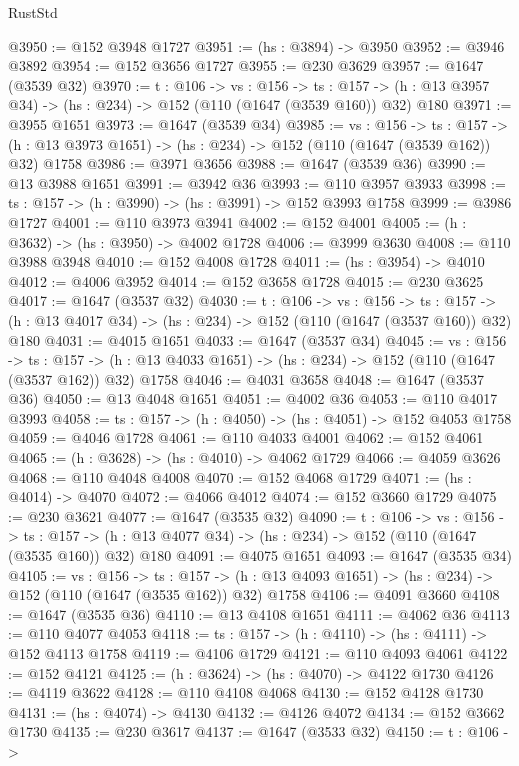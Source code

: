 \begin{lexlean}{RustStd}
\begin{coremodule}
@3950 := @152 @3948 @1727
@3951 := (hs : @3894) -> @3950
@3952 := @3946 @3892
@3954 := @152 @3656 @1727
@3955 := @230 @3629
@3957 := @1647 (@3539 @32)
@3970 := {t : @106} ->
  {vs : @156} ->
  {ts : @157} -> (h : @13 @3957 @34) -> (hs : @234) -> @152 (@110 (@1647 (@3539 @160)) @32) @180
@3971 := @3955 @1651
@3973 := @1647 (@3539 @34)
@3985 := {vs : @156} ->
  {ts : @157} -> (h : @13 @3973 @1651) -> (hs : @234) -> @152 (@110 (@1647 (@3539 @162)) @32) @1758
@3986 := @3971 @3656
@3988 := @1647 (@3539 @36)
@3990 := @13 @3988 @1651
@3991 := @3942 @36
@3993 := @110 @3957 @3933
@3998 := {ts : @157} -> (h : @3990) -> (hs : @3991) -> @152 @3993 @1758
@3999 := @3986 @1727
@4001 := @110 @3973 @3941
@4002 := @152 @4001
@4005 := (h : @3632) -> (hs : @3950) -> @4002 @1728
@4006 := @3999 @3630
@4008 := @110 @3988 @3948
@4010 := @152 @4008 @1728
@4011 := (hs : @3954) -> @4010
@4012 := @4006 @3952
@4014 := @152 @3658 @1728
@4015 := @230 @3625
@4017 := @1647 (@3537 @32)
@4030 := {t : @106} ->
  {vs : @156} ->
  {ts : @157} -> (h : @13 @4017 @34) -> (hs : @234) -> @152 (@110 (@1647 (@3537 @160)) @32) @180
@4031 := @4015 @1651
@4033 := @1647 (@3537 @34)
@4045 := {vs : @156} ->
  {ts : @157} -> (h : @13 @4033 @1651) -> (hs : @234) -> @152 (@110 (@1647 (@3537 @162)) @32) @1758
@4046 := @4031 @3658
@4048 := @1647 (@3537 @36)
@4050 := @13 @4048 @1651
@4051 := @4002 @36
@4053 := @110 @4017 @3993
@4058 := {ts : @157} -> (h : @4050) -> (hs : @4051) -> @152 @4053 @1758
@4059 := @4046 @1728
@4061 := @110 @4033 @4001
@4062 := @152 @4061
@4065 := (h : @3628) -> (hs : @4010) -> @4062 @1729
@4066 := @4059 @3626
@4068 := @110 @4048 @4008
@4070 := @152 @4068 @1729
@4071 := (hs : @4014) -> @4070
@4072 := @4066 @4012
@4074 := @152 @3660 @1729
@4075 := @230 @3621
@4077 := @1647 (@3535 @32)
@4090 := {t : @106} ->
  {vs : @156} ->
  {ts : @157} -> (h : @13 @4077 @34) -> (hs : @234) -> @152 (@110 (@1647 (@3535 @160)) @32) @180
@4091 := @4075 @1651
@4093 := @1647 (@3535 @34)
@4105 := {vs : @156} ->
  {ts : @157} -> (h : @13 @4093 @1651) -> (hs : @234) -> @152 (@110 (@1647 (@3535 @162)) @32) @1758
@4106 := @4091 @3660
@4108 := @1647 (@3535 @36)
@4110 := @13 @4108 @1651
@4111 := @4062 @36
@4113 := @110 @4077 @4053
@4118 := {ts : @157} -> (h : @4110) -> (hs : @4111) -> @152 @4113 @1758
@4119 := @4106 @1729
@4121 := @110 @4093 @4061
@4122 := @152 @4121
@4125 := (h : @3624) -> (hs : @4070) -> @4122 @1730
@4126 := @4119 @3622
@4128 := @110 @4108 @4068
@4130 := @152 @4128 @1730
@4131 := (hs : @4074) -> @4130
@4132 := @4126 @4072
@4134 := @152 @3662 @1730
@4135 := @230 @3617
@4137 := @1647 (@3533 @32)
@4150 := {t : @106} ->

\end{coremodule}
\end{lexlean}
